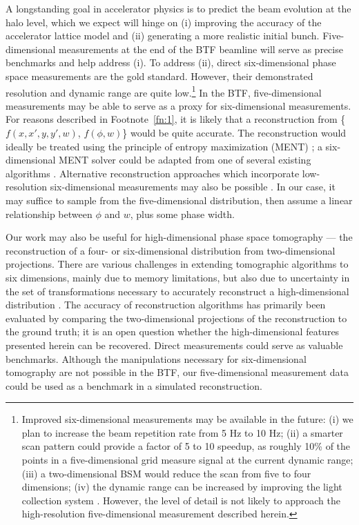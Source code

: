 \documentclass[%
 reprint,
nofootinbib,
 amsmath,amssymb,
 aps,
prstab,
]{revtex4-2}
\begin{document}
A longstanding goal in accelerator physics is to predict the beam evolution at the halo level, which we expect will hinge on (i) improving the accuracy of the accelerator lattice model and (ii) generating a more realistic initial bunch. Five-dimensional measurements at the end of the BTF beamline will serve as precise benchmarks and help address (i). To address (ii), direct six-dimensional phase space measurements are the gold standard. However, their demonstrated resolution and dynamic range are quite low.\footnote{Improved six-dimensional measurements may be available in the future: (i) we plan to increase the beam repetition rate from 5 Hz to 10 Hz; (ii) a smarter scan pattern could provide a factor of 5 to 10 speedup, as roughly 10\% of the points in a five-dimensional grid measure signal at the current dynamic range; (iii) a two-dimensional BSM would reduce the scan from five to four dimensions; (iv) the dynamic range can be increased by improving the light collection system \cite{Aleksandrov2021}. However, the level of detail is not likely to approach the high-resolution five-dimensional measurement described herein.} In the BTF, five-dimensional measurements may be able to serve as a proxy for six-dimensional measurements. For reasons described in Footnote~\ref{fn:1}, it is likely that a  reconstruction from \{$f(x, x', y, y', w)$, $f(\phi, w)$\} would be quite accurate. The reconstruction would ideally be treated using the principle of entropy maximization (MENT) \cite{Skilling1991}; a six-dimensional MENT solver could be adapted from one of several existing algorithms \cite{Skilling1984, Wong2022-tomography}. Alternative reconstruction approaches which incorporate low-resolution six-dimensional measurements may also be possible \cite{Dropulic2021}. In our case, it may suffice to sample from the five-dimensional distribution, then assume a linear relationship between $\phi$ and $w$, plus some phase width.

Our work may also be useful for high-dimensional phase space tomography --- the reconstruction of a four- or six-dimensional distribution from two-dimensional projections. There are various challenges in extending tomographic algorithms to six dimensions, mainly due to memory limitations, but also due to uncertainty in the set of transformations necessary to accurately reconstruct a high-dimensional distribution \cite{Hock2013, Wang2019, Wolski2020, Marchetti2021, Jaster-Merz2022, Wong2022-tomography, Wolski2022}. The accuracy of reconstruction algorithms has primarily been evaluated by comparing the two-dimensional projections of the reconstruction to the ground truth; it is an open question whether the high-dimensional features presented herein can be recovered. Direct measurements could serve as valuable benchmarks. Although the manipulations necessary for six-dimensional tomography are not possible in the BTF, our five-dimensional measurement data \cite{Hoover2023_Zenodo} could be used as a benchmark in a simulated reconstruction.
\end{document}
